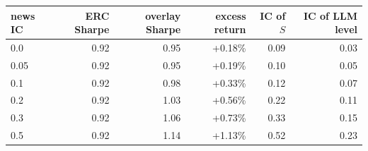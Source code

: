 \begin{tabular}{@{}lrrrrr@{}}
\toprule
news IC & ERC Sharpe & overlay Sharpe & excess return & IC of $S$ & IC of LLM level \\
\midrule
0.0 & 0.92 & 0.95 & +0.18\% & 0.09 & 0.03 \\
0.05 & 0.92 & 0.95 & +0.19\% & 0.10 & 0.05 \\
0.1 & 0.92 & 0.98 & +0.33\% & 0.12 & 0.07 \\
0.2 & 0.92 & 1.03 & +0.56\% & 0.22 & 0.11 \\
0.3 & 0.92 & 1.06 & +0.73\% & 0.33 & 0.15 \\
0.5 & 0.92 & 1.14 & +1.13\% & 0.52 & 0.23 \\
\bottomrule
\end{tabular}

